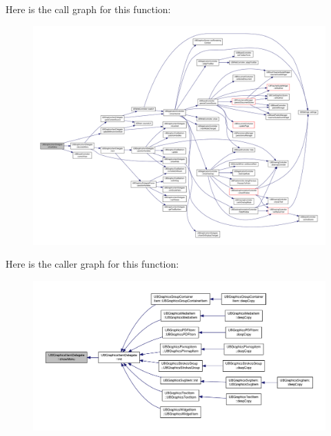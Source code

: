 Here is the call graph for this function\-:
\nopagebreak
\begin{figure}[H]
\begin{center}
\leavevmode
\includegraphics[width=350pt]{dd/dd5/class_u_b_graphics_item_delegate_a2d0f4c4ab6660fc42dc76d89ca8a7240_cgraph}
\end{center}
\end{figure}




Here is the caller graph for this function\-:
\nopagebreak
\begin{figure}[H]
\begin{center}
\leavevmode
\includegraphics[width=350pt]{dd/dd5/class_u_b_graphics_item_delegate_a2d0f4c4ab6660fc42dc76d89ca8a7240_icgraph}
\end{center}
\end{figure}


